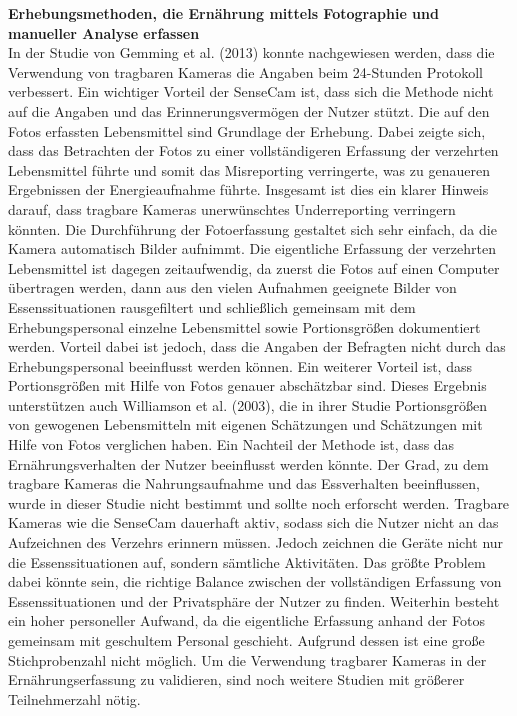 \textbf{Erhebungsmethoden, die Ernährung mittels Fotographie und manueller Analyse erfassen}\\
In der Studie von Gemming et al. (2013) konnte nachgewiesen werden, dass die Verwendung von tragbaren Kameras die Angaben beim 24-Stunden Protokoll verbessert. Ein wichtiger Vorteil der SenseCam ist, dass sich die Methode nicht auf die Angaben und das Erinnerungsvermögen der Nutzer stützt. Die auf den Fotos erfassten Lebensmittel sind Grundlage der Erhebung. Dabei zeigte sich, dass das Betrachten der Fotos zu einer vollständigeren Erfassung der verzehrten Lebensmittel führte und somit das Misreporting verringerte, was zu genaueren Ergebnissen der Energieaufnahme führte. Insgesamt ist dies ein klarer Hinweis darauf, dass tragbare Kameras unerwünschtes Underreporting verringern könnten. Die Durchführung der Fotoerfassung gestaltet sich sehr einfach, da die Kamera automatisch Bilder aufnimmt. Die eigentliche Erfassung der verzehrten Lebensmittel ist dagegen zeitaufwendig, da zuerst die Fotos auf einen Computer übertragen werden, dann aus den vielen Aufnahmen geeignete Bilder von Essenssituationen rausgefiltert und schließlich gemeinsam mit dem Erhebungspersonal einzelne Lebensmittel sowie Portionsgrößen dokumentiert werden. Vorteil dabei ist jedoch, dass die Angaben der Befragten nicht durch das Erhebungspersonal beeinflusst werden können. Ein weiterer Vorteil ist, dass Portionsgrößen mit Hilfe von Fotos genauer abschätzbar sind. Dieses Ergebnis unterstützen auch Williamson et al. (2003), die in ihrer Studie Portionsgrößen von gewogenen Lebensmitteln mit eigenen Schätzungen und Schätzungen mit Hilfe von Fotos verglichen haben. Ein Nachteil der Methode ist, dass das Ernährungsverhalten der Nutzer beeinflusst werden könnte. Der Grad, zu dem tragbare Kameras die Nahrungsaufnahme und das Essverhalten beeinflussen, wurde in dieser Studie nicht bestimmt und sollte noch erforscht werden. Tragbare Kameras wie die SenseCam dauerhaft aktiv, sodass sich die Nutzer nicht an das Aufzeichnen des Verzehrs erinnern müssen. Jedoch zeichnen die Geräte nicht nur die Essenssituationen auf, sondern sämtliche Aktivitäten. Das größte Problem dabei könnte sein, die richtige Balance zwischen der vollständigen Erfassung von Essenssituationen und der Privatsphäre der Nutzer zu finden. Weiterhin besteht ein hoher personeller Aufwand, da die eigentliche Erfassung anhand der Fotos gemeinsam mit geschultem Personal geschieht. Aufgrund dessen ist eine große Stichprobenzahl nicht möglich. Um die Verwendung tragbarer Kameras in der Ernährungserfassung zu validieren, sind noch weitere Studien mit größerer Teilnehmerzahl nötig. 
